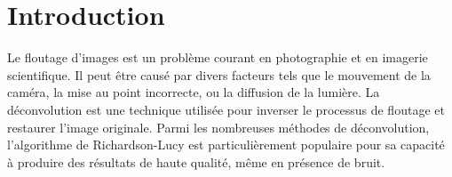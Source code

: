 \section{Introduction}
Le floutage d'images est un problème courant en photographie et en imagerie scientifique. Il peut être causé par divers facteurs tels que le mouvement de la caméra, la mise au point incorrecte, ou la diffusion de la lumière. La déconvolution est une technique utilisée pour inverser le processus de floutage et restaurer l'image originale. Parmi les nombreuses méthodes de déconvolution, l'algorithme de Richardson-Lucy est particulièrement populaire pour sa capacité à produire des résultats de haute qualité, même en présence de bruit.
